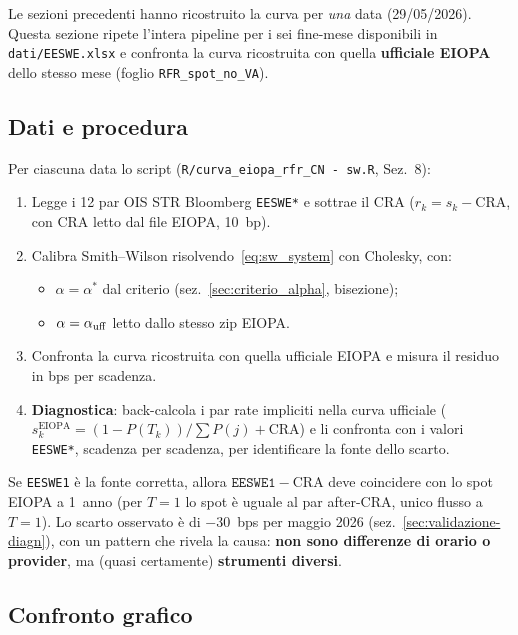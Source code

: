 \documentclass[11pt,a4paper]{article}
\theoremstyle{plain}
\theoremstyle{definition}
\theoremstyle{remark}
\newcommand{\CRA}{\ensuremath{\mathrm{CRA}}}
\begin{document}
Le sezioni precedenti hanno ricostruito la curva per \emph{una} data (29/05/2026).
Questa sezione ripete l'intera pipeline per i sei fine-mese disponibili in
\texttt{dati/EESWE.xlsx} e confronta la curva ricostruita con quella
\textbf{ufficiale EIOPA} dello stesso mese (foglio \texttt{RFR\_spot\_no\_VA}).

\subsection{Dati e procedura}
\label{sec:validazione-dati}

Per ciascuna data lo script (\texttt{R/curva\_eiopa\_rfr\_CN\ -\ sw.R}, Sez.~8):
\begin{enumerate}
  \item Legge i 12 par OIS \texteuro{}STR Bloomberg \texttt{EESWE*} e sottrae il CRA
        ($r_k = s_k - \CRA$, con CRA letto dal file EIOPA, 10~bp).
  \item Calibra Smith--Wilson risolvendo~\eqref{eq:sw_system} con Cholesky, con:
  \begin{itemize}
    \item $\alpha = \alpha^*$ dal criterio (sez.~\ref{sec:criterio_alpha}, bisezione);
    \item $\alpha = \alpha_{\rm uff}$ letto dallo stesso zip EIOPA.
  \end{itemize}
  \item Confronta la curva ricostruita con quella ufficiale EIOPA e misura il residuo
        in bps per scadenza.
  \item \textbf{Diagnostica}: back-calcola i par rate impliciti nella curva ufficiale
        ($s_k^{\text{EIOPA}} = (1 - P(T_k))/\sum P(j) + \CRA$) e li confronta con i
        valori \texttt{EESWE*}, scadenza per scadenza, per identificare la fonte dello scarto.
\end{enumerate}

\begin{keybox}
Se \texttt{EESWE1} \`e la fonte corretta, allora $\texttt{EESWE1} - \CRA$ deve coincidere
con lo spot EIOPA a 1~anno (per $T=1$ lo spot \`e uguale al par after-CRA, unico flusso
a $T=1$). Lo scarto osservato \`e di $-30$~bps per maggio 2026 (sez.~\ref{sec:validazione-diagn}),
con un pattern che rivela la causa: \textbf{non sono differenze di orario o provider}, ma
(quasi certamente) \textbf{strumenti diversi}.
\end{keybox}

\subsection{Confronto grafico}
\end{document}
